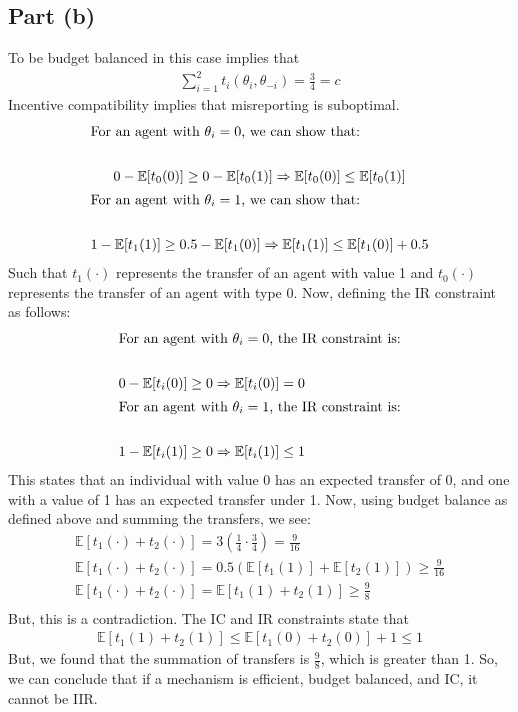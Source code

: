 \documentclass[10pt,a4paper]{article}
\begin{document}
  \subsection*{Part (b)}
    To be budget balanced in this case implies that 
    \begin{gather*}
      \sum\limits_{i=1}^2 t_i(\theta_i,\theta_{-i}) = \frac{3}{4} = c
    \end{gather*}
    Incentive compatibility implies that misreporting is suboptimal. 
    \begin{gather*}
      \shortintertext{For an agent with $\theta_i = 0$, we can show that:} \\
      0 - \mathbb{E}[t_0(0)] \geq 0 - \mathbb{E}[t_0(1)] \Rightarrow \mathbb{E}[t_0(0)] \leq \mathbb{E}[t_0(1)] \\
      \shortintertext{For an agent with $\theta_i = 1$, we can show that:} \\
      1 - \mathbb{E}[t_1(1)] \geq 0.5 - \mathbb{E}[t_1(0)] \Rightarrow \mathbb{E}[t_1(1)] \leq \mathbb{E}[t_1(0)] + 0.5 \\
    \end{gather*}
    Such that $t_1(\cdot)$ represents the transfer of an agent with value 1 and $t_0(\cdot)$ represents the transfer of an agent with type 0. Now, defining the IR constraint as follows:
    \begin{gather*}
      \shortintertext{For an agent with $\theta_i = 0$, the IR constraint is:} \\
      0 - \mathbb{E}[t_i(0)] \geq 0 \Rightarrow \mathbb{E}[t_i(0)] = 0 \\
      \shortintertext{For an agent with $\theta_i = 1$, the IR constraint is:} \\
      1 - \mathbb{E}[t_i(1)] \geq 0 \Rightarrow \mathbb{E}[t_i(1)] \leq 1 \\
    \end{gather*}
    This states that an individual with value 0 has an expected transfer of 0, and one with a value of 1 has an expected transfer under 1.
    Now, using budget balance as defined above and summing the transfers, we see:
    \begin{gather*}
      \mathbb{E}[t_1(\cdot)+t_2(\cdot)] = 3(\frac{1}{4}\cdot\frac{3}{4}) = \frac{9}{16} \\
      \mathbb{E}[t_1(\cdot) + t_2(\cdot)] = 0.5(\mathbb{E}[t_1(1)] + \mathbb{E}[t_2(1)]) \geq \frac{9}{16} \\
      \mathbb{E}[t_1(\cdot) + t_2(\cdot)] = \mathbb{E}[t_1(1)+t_2(1)] \geq \frac{9}{8} \\
    \end{gather*}
    But, this is a contradiction. The IC and IR constraints state that
    \begin{gather*}
      \mathbb{E}[t_1(1) + t_2(1)] \leq \mathbb{E}[t_1(0) + t_2(0)] + 1 \leq 1
    \end{gather*}
    But, we found that the summation of transfers is $\frac{9}{8}$, which is greater than 1. So, we can conclude that if a mechanism is efficient, budget balanced, and IC, it cannot be IIR.
\end{document}
